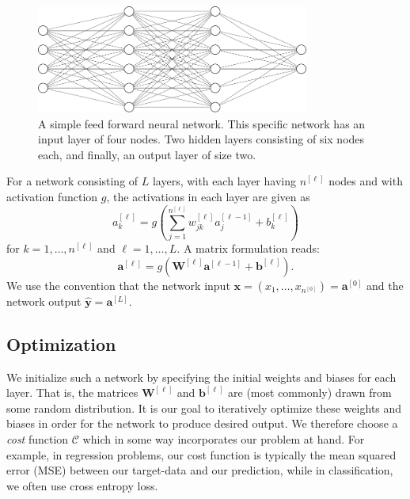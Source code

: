 \documentclass[a4paper, oneside, article]{memoir}
\newcommand{\yhat}{\hat{\bm{y}}}
\newcommand{\mat}[1]{\bm{#1}}
\newcommand{\cost}{\mathcal{C}}
\begin{document}
	\begin{figure}[htbp]
		\centering
		\includegraphics[width=0.8\textwidth]{imgs/fcc_nn.pdf}
		\caption{A simple feed forward neural network. This specific
		network has an input layer of four nodes. Two hidden layers
	consisting of six nodes each, and finally, an output layer of size
two.}%
\label{fig:fc_nn}
	\end{figure}
	
	For a network consisting of \( L \) layers, with each layer having \(
	n^{[\ell]} \) nodes and with activation function \( g\), the
	activations in each layer are given as 
	\begin{equation}
		a^{[\ell]}_k = g\left(\sum_{j = 1}^{n^{[\ell]}} w_{jk}^{[\ell]} a^{[\ell - 1]}_j  + b^{[\ell]}_k \right)
	\end{equation}
	for \( k = 1, \ldots, n^{[\ell]} \) and \( \ell = 1, \ldots, L \). 
	A matrix formulation reads:
	\begin{equation}
	\mat{a}^{[\ell]} = g\left(\mat{W}^{[\ell]} \mat{a}^{[\ell - 1]} + \mat{b}^{[\ell]}\right).
	\end{equation}
	We use the convention that the network input \( \mat{x} = (x_1, \ldots,
	x_{n^{[0]}}) = \mat{a}^{[0]} \) and the network output \( \yhat =
	\mat{a}^{[L]} \).
	
	\subsection{Optimization}
	
	We initialize such a network by specifying the initial weights and
	biases for each layer. That is, the matrices \( \mat{W}^{[\ell]} \) and
	\( \mat{b}^{[\ell]} \) are (most commonly) drawn from some random
	distribution. It is our goal to iteratively optimize these weights and
	biases in order for the network to produce desired output. We therefore
	choose a \emph{cost} function  \( \cost \) which in some way
	incorporates our problem at hand. For example, in regression problems,
	our cost function is typically the mean squared error (MSE) between our
	target-data and our prediction, while in classification, we often use
	cross entropy loss.
	
\end{document}
